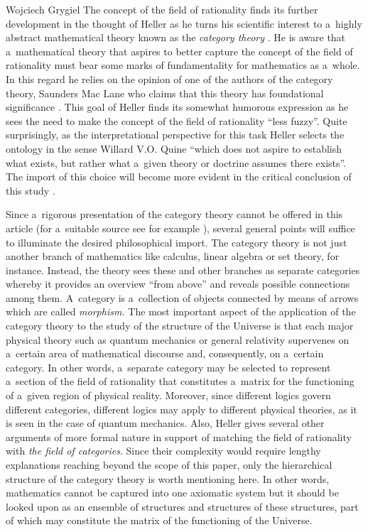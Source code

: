 \begin{artengenv}{Wojciech Grygiel}
The concept of the field of rationality finds its further development in the thought of Heller as he turns his scientific interest to a~highly abstract mathematical theory known as the \textit{category theory}
\parencite[][]{heller_field_2014}. %
 He is aware that a~mathematical theory that aspires to better capture the concept of the field of rationality must bear some marks of fundamentality for mathematics as a~whole. In this regard he relies on the opinion of one of the authors of the category theory, Saunders Mac Lane who claims that this theory has foundational significance 
\parencite[][]{mac_lane_protean_1992}. %
 This goal of Heller finds its somewhat humorous expression as he sees the need to make the concept of the field of rationality ``less fuzzy''. Quite surprisingly, as the interpretational perspective for this task Heller selects the ontology in the sense Willard V.O. Quine ``which does not aspire to establish what exists, but rather what a~given theory or doctrine assumes there exists''. The import of this choice will become more evident in the critical conclusion of this study 
\parencite[][p.442]{heller_field_2014}.%


Since a~rigorous presentation of the category theory cannot be offered in this article (for a~suitable source see for example
\parencite[][]{simmons_introduction_2011}%
), several general points will suffice to illuminate the desired philosophical import. The category theory is not just another branch of mathematics like calculus, linear algebra or set theory, for instance. Instead, the theory sees these and other branches as separate categories whereby it provides an overview ``from above'' and reveals possible connections among them. A~category is a~collection of objects connected by means of arrows which are called \textit{morphism.} The most important aspect of the application of the category theory to the study of the structure of the Universe is that each major physical theory such as quantum mechanics or general relativity supervenes on a~certain area of mathematical discourse and, consequently, on a~certain category. In other words, a~separate category may be selected to represent a~section of the field of rationality that constitutes a~matrix for the functioning of a~given region of physical reality. Moreover, since different logics govern different categories, different logics may apply to different physical theories, as it is seen in the case of quantum mechanics. Also, Heller gives several other arguments of more formal nature in support of matching the field of rationality with \textit{the field of categories}. Since their complexity would require lengthy explanations reaching beyond the scope of this paper, only the hierarchical structure of the category theory is worth mentioning here. In other words, mathematics cannot be captured into one axiomatic system but it should be looked upon as an ensemble of structures and structures of these structures, part of which may constitute the matrix of the functioning of the Universe.


\end{artengenv}
